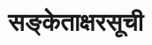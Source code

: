 %
%
%

\renewcommand\chaptername{}
\chapter[सङ्केताक्षरसूची]{सङ्केताक्षरसूची}
\fontsize{14}{21}\selectfont
